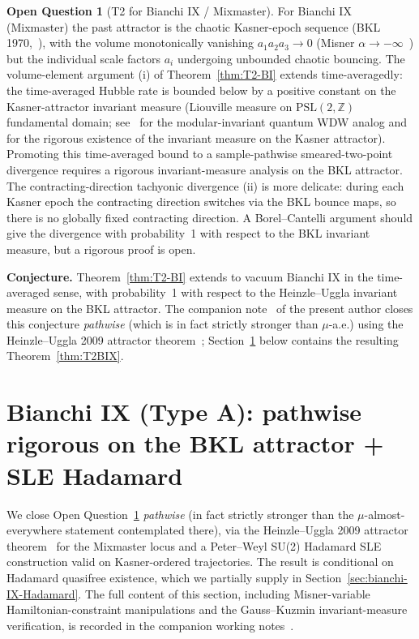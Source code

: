 \documentclass[11pt]{article}
\theoremstyle{definition}
\newtheorem{question}[theorem]{Open Question}
\newcommand{\Z}{\mathbb{Z}}
\begin{document}
\begin{question}[T2 for Bianchi IX / Mixmaster]\label{q:T2-BIX}
For Bianchi IX (Mixmaster) the past attractor is the chaotic Kasner-epoch sequence (BKL 1970,~\cite{BKL1970}), with the volume monotonically vanishing $a_1 a_2 a_3 \to 0$ (Misner $\alpha\to-\infty$~\cite{Misner1969}) but the individual scale factors $a_i$ undergoing unbounded chaotic bouncing. The volume-element argument (i) of Theorem~\ref{thm:T2-BI} extends time-averagedly: the time-averaged Hubble rate is bounded below by a positive constant on the Kasner-attractor invariant measure (Liouville measure on $\mathrm{PSL}(2,\Z)$ fundamental domain; see~\cite{HartnollYang2025} for the modular-invariant quantum WDW analog and~\cite{HeinzleUggla2009} for the rigorous existence of the invariant measure on the Kasner attractor). Promoting this time-averaged bound to a sample-pathwise smeared-two-point divergence requires a rigorous invariant-measure analysis on the BKL attractor. The contracting-direction tachyonic divergence (ii) is more delicate: during each Kasner epoch the contracting direction switches via the BKL bounce maps, so there is no globally fixed contracting direction. A Borel--Cantelli argument should give the divergence with probability~1 with respect to the BKL invariant measure, but a rigorous proof is open.

\textbf{Conjecture.} Theorem~\ref{thm:T2-BI} extends to vacuum Bianchi IX in the time-averaged sense, with probability~1 with respect to the Heinzle--Uggla invariant measure on the BKL attractor. The companion note~\cite{T2_bianchi_IX_note} of the present author closes this conjecture \emph{pathwise} (which is in fact strictly stronger than $\mu$-a.e.) using the Heinzle--Uggla 2009 attractor theorem~\cite{HeinzleUgglaAttractor2009}; Section~\ref{sec:bianchi-IX} below contains the resulting Theorem~\ref{thm:T2BIX}.
\end{question}

\section{Bianchi IX (Type A): pathwise rigorous on the BKL attractor + SLE Hadamard}\label{sec:bianchi-IX}

We close Open Question~\ref{q:T2-BIX} \emph{pathwise} (in fact strictly stronger than the $\mu$-almost-everywhere statement contemplated there), via the Heinzle--Uggla 2009 attractor theorem~\cite{HeinzleUgglaAttractor2009} for the Mixmaster locus and a Peter--Weyl SU(2) Hadamard SLE construction valid on Kasner-ordered trajectories. The result is conditional on Hadamard quasifree existence, which we partially supply in Section~\ref{sec:bianchi-IX-Hadamard}. The full content of this section, including Misner-variable Hamiltonian-constraint manipulations and the Gauss--Kuzmin invariant-measure verification, is recorded in the companion working notes~\cite{T2_bianchi_IX_note,hadamard_BIX_note}.
\end{document}
